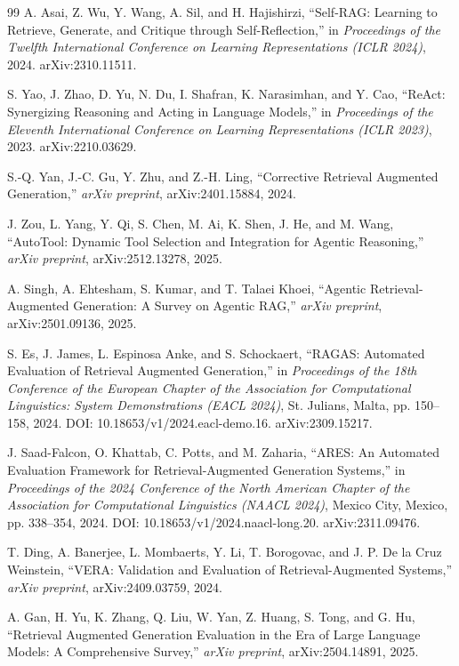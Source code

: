\documentclass[twocolumn,10pt]{article}
\begin{document}
\begin{thebibliography}{99}
A. Asai, Z. Wu, Y. Wang, A. Sil, and H. Hajishirzi, ``Self-RAG: Learning to Retrieve, Generate, and Critique through Self-Reflection,'' in \emph{Proceedings of the Twelfth International Conference on Learning Representations (ICLR 2024)}, 2024. arXiv:2310.11511.

S. Yao, J. Zhao, D. Yu, N. Du, I. Shafran, K. Narasimhan, and Y. Cao, ``ReAct: Synergizing Reasoning and Acting in Language Models,'' in \emph{Proceedings of the Eleventh International Conference on Learning Representations (ICLR 2023)}, 2023. arXiv:2210.03629.

S.-Q. Yan, J.-C. Gu, Y. Zhu, and Z.-H. Ling, ``Corrective Retrieval Augmented Generation,'' \emph{arXiv preprint}, arXiv:2401.15884, 2024.

J. Zou, L. Yang, Y. Qi, S. Chen, M. Ai, K. Shen, J. He, and M. Wang, ``AutoTool: Dynamic Tool Selection and Integration for Agentic Reasoning,'' \emph{arXiv preprint}, arXiv:2512.13278, 2025.

A. Singh, A. Ehtesham, S. Kumar, and T. Talaei Khoei, ``Agentic Retrieval-Augmented Generation: A Survey on Agentic RAG,'' \emph{arXiv preprint}, arXiv:2501.09136, 2025.

S. Es, J. James, L. Espinosa Anke, and S. Schockaert, ``RAGAS: Automated Evaluation of Retrieval Augmented Generation,'' in \emph{Proceedings of the 18th Conference of the European Chapter of the Association for Computational Linguistics: System Demonstrations (EACL 2024)}, St. Julians, Malta, pp. 150--158, 2024. DOI: 10.18653/v1/2024.eacl-demo.16. arXiv:2309.15217.

J. Saad-Falcon, O. Khattab, C. Potts, and M. Zaharia, ``ARES: An Automated Evaluation Framework for Retrieval-Augmented Generation Systems,'' in \emph{Proceedings of the 2024 Conference of the North American Chapter of the Association for Computational Linguistics (NAACL 2024)}, Mexico City, Mexico, pp. 338--354, 2024. DOI: 10.18653/v1/2024.naacl-long.20. arXiv:2311.09476.

T. Ding, A. Banerjee, L. Mombaerts, Y. Li, T. Borogovac, and J. P. De la Cruz Weinstein, ``VERA: Validation and Evaluation of Retrieval-Augmented Systems,'' \emph{arXiv preprint}, arXiv:2409.03759, 2024.

A. Gan, H. Yu, K. Zhang, Q. Liu, W. Yan, Z. Huang, S. Tong, and G. Hu, ``Retrieval Augmented Generation Evaluation in the Era of Large Language Models: A Comprehensive Survey,'' \emph{arXiv preprint}, arXiv:2504.14891, 2025.


\end{thebibliography}
\end{document}
